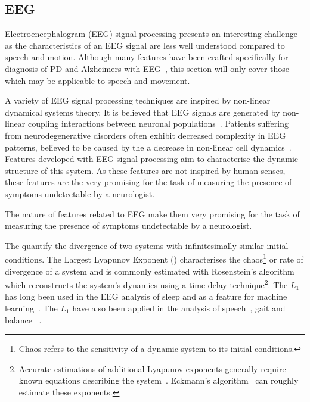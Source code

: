 \documentclass[12pt, twoside]{book}
\renewcommand\emph[1]{\textit{\color{USred}{#1}}}
\begin{document}
\subsection{EEG}
\label{eegsigproc}
Electroencephalogram (EEG) signal processing presents an interesting challenge as the characteristics of an EEG signal are less well understood compared to speech and motion. Although many features have been crafted specifically for diagnosis of PD and Alzheimers with EEG~\cite{eegnonlinearpd, eegalzheimers}, this section will only cover those which may be applicable to speech and movement.

A variety of EEG signal processing techniques are inspired by non-linear dynamical systems theory. It is believed that EEG signals are generated by non-linear coupling interactions between neuronal populations~\cite{eegalzheimers}. Patients suffering from neurodegenerative disorders often exhibit decreased complexity in EEG patterns, believed to be caused by the a decrease in  non-linear cell dynamics~\cite{jelles1999decrease}. Features developed with EEG signal processing aim to characterise the dynamic structure of this system. As these features are not inspired by human senses, these features are the very promising for the task of measuring the presence of symptoms undetectable by a neurologist. 

\begin{highlight}
The nature of features related to EEG make them very promising for the task of measuring the presence of symptoms undetectable by a neurologist.
\end{highlight}

The \emph{Lyapunov Exponents} quantify the divergence of two systems with infinitesimally similar initial conditions. The Largest Lyapunov Exponent (\emph{$L_1$}) characterises the chaos\footnote{Chaos refers to the sensitivity of a dynamic system to its initial conditions.} or rate of divergence of a system and is commonly estimated with Rosenstein's algorithm~\cite{rosenstein1993practicallyapunov} which reconstructs the system's dynamics using a time delay technique\footnote{Accurate estimations of additional Lyapunov exponents generally require known equations describing the system~\cite{lyapunovall}. Eckmann's algorithm~\cite{eckmann1986liapunov} can roughly estimate these exponents.}. The $L_1$ has long been used in the EEG analysis of sleep and as a feature for machine learning~\cite{eeglyapunov1, eeglyapunov2}. The $L_1$ have also been applied in the analysis of speech~\cite{banbrook1999speechlyapunov,kokkinos2005nonlinearlyapunov}, gait and balance ~\cite{dingwell2000nonlinearlyapunov, howcroft2014analysisgaitlyapunov, liu2015analysislyapunov}.
\end{document}

